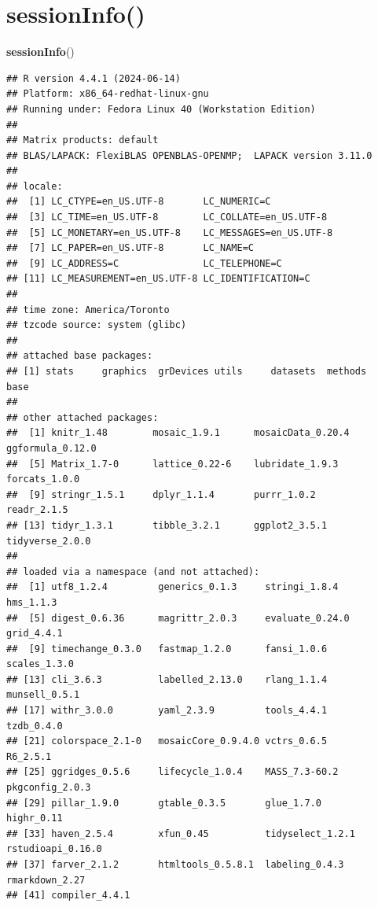 \documentclass[
  10pt,
]{article}
\newenvironment{Shaded}{\begin{snugshade}}{\end{snugshade}}
\newcommand{\FunctionTok}[1]{\textcolor[rgb]{0.13,0.29,0.53}{\textbf{#1}}}
\newcommand{\NormalTok}[1]{#1}
\begin{document}
\hypertarget{sessioninfo}{%
\section{sessionInfo()}\label{sessioninfo}}

\begin{Shaded}
\begin{Highlighting}[]
\FunctionTok{sessionInfo}\NormalTok{()}
\end{Highlighting}
\end{Shaded}

\begin{verbatim}
## R version 4.4.1 (2024-06-14)
## Platform: x86_64-redhat-linux-gnu
## Running under: Fedora Linux 40 (Workstation Edition)
## 
## Matrix products: default
## BLAS/LAPACK: FlexiBLAS OPENBLAS-OPENMP;  LAPACK version 3.11.0
## 
## locale:
##  [1] LC_CTYPE=en_US.UTF-8       LC_NUMERIC=C              
##  [3] LC_TIME=en_US.UTF-8        LC_COLLATE=en_US.UTF-8    
##  [5] LC_MONETARY=en_US.UTF-8    LC_MESSAGES=en_US.UTF-8   
##  [7] LC_PAPER=en_US.UTF-8       LC_NAME=C                 
##  [9] LC_ADDRESS=C               LC_TELEPHONE=C            
## [11] LC_MEASUREMENT=en_US.UTF-8 LC_IDENTIFICATION=C       
## 
## time zone: America/Toronto
## tzcode source: system (glibc)
## 
## attached base packages:
## [1] stats     graphics  grDevices utils     datasets  methods   base     
## 
## other attached packages:
##  [1] knitr_1.48        mosaic_1.9.1      mosaicData_0.20.4 ggformula_0.12.0 
##  [5] Matrix_1.7-0      lattice_0.22-6    lubridate_1.9.3   forcats_1.0.0    
##  [9] stringr_1.5.1     dplyr_1.1.4       purrr_1.0.2       readr_2.1.5      
## [13] tidyr_1.3.1       tibble_3.2.1      ggplot2_3.5.1     tidyverse_2.0.0  
## 
## loaded via a namespace (and not attached):
##  [1] utf8_1.2.4         generics_0.1.3     stringi_1.8.4      hms_1.1.3         
##  [5] digest_0.6.36      magrittr_2.0.3     evaluate_0.24.0    grid_4.4.1        
##  [9] timechange_0.3.0   fastmap_1.2.0      fansi_1.0.6        scales_1.3.0      
## [13] cli_3.6.3          labelled_2.13.0    rlang_1.1.4        munsell_0.5.1     
## [17] withr_3.0.0        yaml_2.3.9         tools_4.4.1        tzdb_0.4.0        
## [21] colorspace_2.1-0   mosaicCore_0.9.4.0 vctrs_0.6.5        R6_2.5.1          
## [25] ggridges_0.5.6     lifecycle_1.0.4    MASS_7.3-60.2      pkgconfig_2.0.3   
## [29] pillar_1.9.0       gtable_0.3.5       glue_1.7.0         highr_0.11        
## [33] haven_2.5.4        xfun_0.45          tidyselect_1.2.1   rstudioapi_0.16.0 
## [37] farver_2.1.2       htmltools_0.5.8.1  labeling_0.4.3     rmarkdown_2.27    
## [41] compiler_4.4.1
\end{verbatim}
\end{document}
